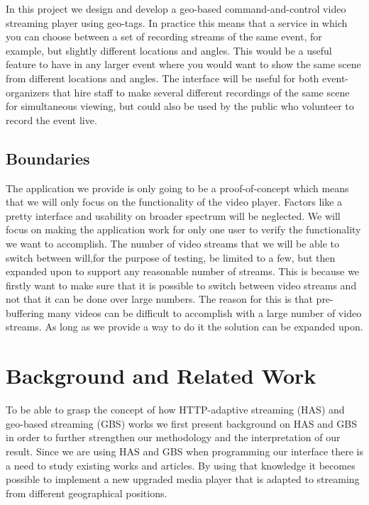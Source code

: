 \documentclass[9pt,a4paper]{acmproc}
\begin{document}
In this project we design and develop a geo-based command-and-control video streaming player using geo-tags. In practice this means that a service in which you can choose between a set of recording streams of the same event, for example, but slightly different locations and angles. This would be a useful feature to have in any larger event where you would want to show the same scene from different locations and angles. The interface will be useful for both event-organizers that hire staff to make several different recordings of the same scene for simultaneous viewing, but could also be used by the public who volunteer to record the event live.

\subsection{Boundaries}
The application we provide is only going to be a proof-of-concept which means that we will only focus on the functionality of the video player. Factors like a pretty interface and usability on broader spectrum will be neglected. We will focus on making the application work for only one user to verify the functionality we want to accomplish. The number of video streams that we will be able to switch between will,for the purpose of testing, be limited to a few, but then expanded upon to support any reasonable number of streams. This is because we firstly want to make sure that it is possible to switch between video streams and not that it can be done over large numbers. The reason for this is that pre-buffering many videos can be difficult to accomplish with a large number of video streams. As long as we provide a way to do it the solution can be expanded upon.


\section{Background and Related Work}
To be able to grasp the concept of how HTTP-adaptive streaming (HAS) and geo-based streaming (GBS) works we first present background on HAS and GBS in order to further strengthen our methodology and the interpretation of our result. Since we are using HAS and GBS when programming our interface there is a need to study existing works and articles. By using that knowledge it becomes possible to implement a new upgraded media player that is adapted to streaming from different geographical positions.
\end{document}
